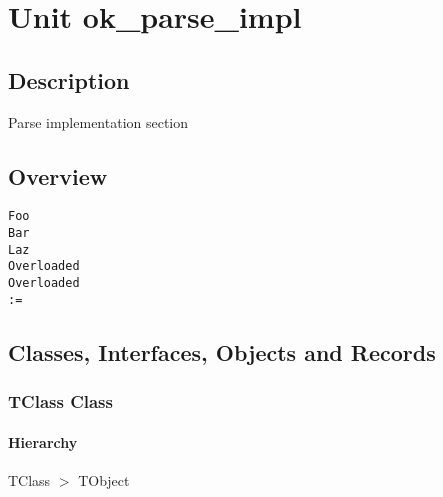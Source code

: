 \documentclass{report}
\newif\ifpdf
\begin{document}
\label{toc}\tableofcontents
\newpage
\newlength{\tmplength}
\chapter{Unit ok{\_}parse{\_}impl}
\label{ok_parse_impl}
\section{Description}
Parse implementation section
\section{Overview}
\begin{description}
\item[\texttt{\begin{ttfamily}TClass\end{ttfamily} Class}]
\item[\texttt{\begin{ttfamily}TMyType\end{ttfamily} Record}]
\end{description}
\begin{description}
\item[\texttt{Foo}]
\item[\texttt{Bar}]
\item[\texttt{Laz}]
\item[\texttt{Overloaded}]
\item[\texttt{Overloaded}]
\item[\texttt{:=}]
\end{description}
\section{Classes, Interfaces, Objects and Records}
\ifpdf
\subsection*{\large{\textbf{TClass Class}}\normalsize\hspace{1ex}\hrulefill}
\else
\subsection*{TClass Class}
\fi
\label{ok_parse_impl.TClass}
\subsubsection*{\large{\textbf{Hierarchy}}\normalsize\hspace{1ex}\hfill}
TClass {$>$} TObject
\end{document}
